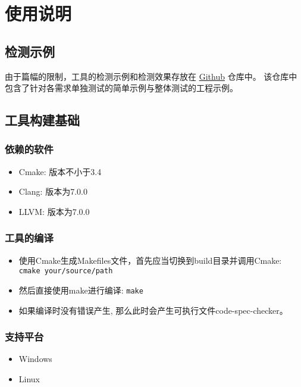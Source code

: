 \section{使用说明}
\label{sec:usage}

\subsection{检测示例}
由于篇幅的限制，工具的检测示例和检测效果存放在 \href{https://github.com/clarazhang/CSpecChecker}{Github} 仓库中。
该仓库中包含了针对各需求单独测试的简单示例与整体测试的工程示例。

\subsection{工具构建基础}

\subsubsection{依赖的软件}
\begin{itemize}
\item Cmake: 版本不小于3.4
\item Clang: 版本为7.0.0
\item LLVM: 版本为7.0.0
\end{itemize}

\subsubsection{工具的编译}
\begin{itemize}
\item 使用Cmake生成Makefiles文件，首先应当切换到build目录并调用Cmake: \newline
\indent \qquad \verb|cmake your/source/path|
\item 然后直接使用make进行编译: \newline
\indent \qquad \verb|make|
\item 如果编译时没有错误产生, 那么此时会产生可执行文件code-spec-checker。
\end{itemize}

\subsubsection{支持平台}
\begin{itemize}
\item Windows
\item Linux
\end{itemize}


